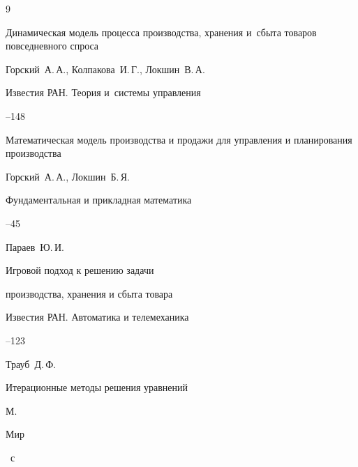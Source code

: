 \begin{thebibliography}{9}




\paper Динамическая модель процесса производства, хранения и~сбыта товаров повседневного спроса

\by  Горский~А.\,А., Колпакова~И.\,Г., Локшин~В.\,А.

\jour Известия РАН. Теория и~системы управления



--148




\paper Математическая модель производства и продажи для управления и планирования производства

\by Горский~А.\,А., Локшин~Б.\,Я.

\jour Фундаментальная и прикладная математика




--45




\by Параев~Ю.\,И.

\paper Игровой подход к решению задачи

производства, хранения и сбыта товара

\jour Известия РАН. Автоматика и телемеханика



--123




\by Трауб~Д.\,Ф.

\book Итерационные методы решения уравнений

\publaddr М.

\publ Мир


~с



\end{thebibliography}



\newpage



\makeengtitlem






% 